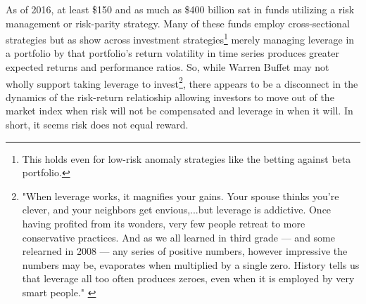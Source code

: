 \noindent %
As of 2016, at least \$150 and as much as \$400 billion sat in funds utilizing a risk management or risk-parity strategy. \citep{cao_risk_2016} Many of these funds employ cross-sectional strategies but as \citet{moreira_volatility-managed_2017} show across investment strategies\footnote{This holds even for low-risk anomaly strategies like the \citet{frazzini_betting_2014} betting against beta portfolio.} merely managing leverage in a portfolio by that portfolio's return volatility in time series produces greater expected returns and performance ratios. So, while Warren Buffet may not wholly support taking leverage to invest\footnote{"When leverage works, it magnifies your gains. Your spouse thinks you're clever, and your neighbors get envious,...but leverage is addictive. Once having profited from its wonders, very few people retreat to more conservative practices. And as we all learned in third grade — and some relearned in 2008 — any series of positive numbers, however impressive the numbers may be, evaporates when multiplied by a single zero. History tells us that leverage all too often produces zeroes, even when it is employed by very smart people." \citep{noauthor_warren_nodate}}, there appears to be a disconnect in the dynamics of the risk-return relatioship allowing investors to move out of the market index when risk will not be compensated and leverage in when it will. In short, it seems risk does not equal reward. %
